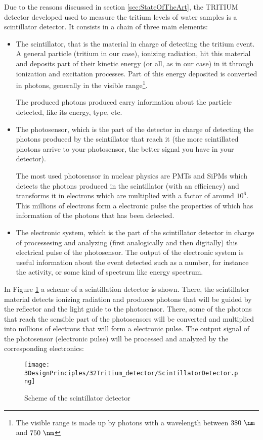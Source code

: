 Due to the reasons discussed in section \ref{sec:StateOfTheArt}, the TRITIUM detector developed used to measure the tritium levels of water samples is a scintillator detector. It consists in a chain of three main elements:

\begin{itemize}

\item{} The scintillator, that is the material in charge of detecting the tritium event. A general particle (tritium in our case), ionizing radiation, hit this material and deposits part of their kinetic energy (or all, as in our case) in it through ionization and excitation processes. Part of this energy deposited is converted in photons, generally in the visible range\footnote{The visible range is made up by photons with a wavelength between $380~\nm$ and $750~\nm$}.

The produced photons produced carry information about the particle detected, like its energy, type, etc.

\item{} The photosensor, which is the part of the detector in charge of detecting the photons produced by the scintillator that reach it (the more scintillated photons arrive to your photosensor, the better signal you have in your detector). 

The most used photosensor in nuclear physics are PMTs and SiPMs which detects the photons produced in the scintillator (with an efficiency) and transforms it in electrons which are multiplied with a factor of around $10^6$. This millions of electrons form a electronic pulse the properties of which has information of the photons that has been detected.

\item{} The electronic system, which is the part of the scintillator detector in charge of processesing and analyzing (first analogically and then digitally) this electrical pulse of the photosensor. The output of the electronic system is useful information about the event detected such as a number, for instance the activity, or some kind of spectrum like energy spectrum.

\end{itemize}

In Figure \ref{fig:ScintillatorDetector} a scheme of a scintillation detector is shown. There, the scintillator material detects ionizing radiation and produces photons that will be guided by the reflector and the light guide to the photosensor. There, some of the photons that reach the sensible part of the photosensors will be converted and multiplied into millions of electrons that will form a electronic pulse. The output signal of the photosensor (electronic pulse) will be processed and analyzed by the corresponding electronics:

\begin{figure}[hbtp]
\texttt{[image: 3DesignPrinciples/32Tritium\_detector/ScintillatorDetector.png]}
\centering
\caption{Scheme of the scintillator detector\label{fig:ScintillatorDetector}}
\end{figure}
